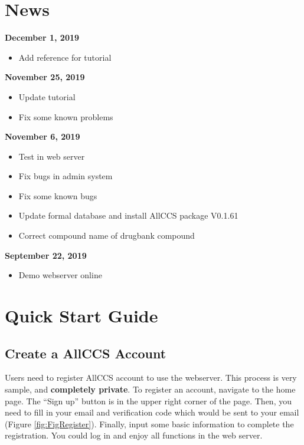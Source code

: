 \documentclass[12pt,]{book}
\providecommand{\tightlist}{%
  \setlength{\itemsep}{0pt}\setlength{\parskip}{0pt}}
\theoremstyle{definition}
\theoremstyle{definition}
\theoremstyle{definition}
\theoremstyle{remark}
\begin{document}
\chapter*{News}\label{news}

\textbf{December 1, 2019}

\begin{itemize}
\tightlist
\item
  Add reference for tutorial
\end{itemize}

\textbf{November 25, 2019}

\begin{itemize}
\tightlist
\item
  Update tutorial
\item
  Fix some known problems
\end{itemize}

\textbf{November 6, 2019}

\begin{itemize}
\tightlist
\item
  Test in web server
\item
  Fix bugs in admin system
\item
  Fix some known bugs
\item
  Update formal database and install AllCCS package V0.1.61
\item
  Correct compound name of drugbank compound 
\end{itemize}

\textbf{September 22, 2019}

\begin{itemize}
\tightlist
\item
  Demo webserver online
\end{itemize}

\chapter{Quick Start Guide}\label{chapter1}

\section{Create a AllCCS Account}\label{chaptere1d1}

Users need to register AllCCS account to use the webserver. This process
is very sample, and \textbf{completely private}. To register an account,
navigate to the home page. The ``Sign up'' button is in the upper right
corner of the page. Then, you need to fill in your email and
verification code which would be sent to your email (Figure
\ref{fig:FigRegister}). Finally, input some basic information to
complete the registration. You could log in and enjoy all functions in
the web server.
\end{document}
